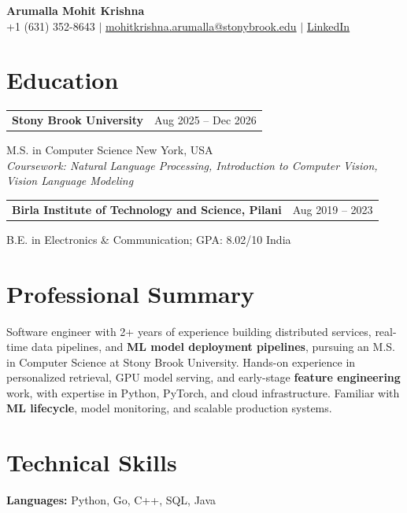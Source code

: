 \documentclass[letterpaper,10pt]{article}
\makeatletter
\newcommand{\entry}[2]{%
  \noindent
  \begin{tabularx}{\linewidth}
    {@{}>{\raggedright\arraybackslash}X@{\hspace{6pt}}r@{}}
    \textbf{#1} & #2
  \end{tabularx}\par
}
\makeatother
\begin{document}
\begin{center}
    {\LARGE\bfseries Arumalla Mohit Krishna}\\[3pt]
    +1 (631) 352-8643 $|$
    \href{mailto:mohitkrishna.arumalla@stonybrook.edu}
    {mohitkrishna.arumalla@stonybrook.edu} $|$
    \href{https://linkedin.com/in/mohit-krishna-arumalla}
    {LinkedIn}
\end{center}
\vspace{-8pt}

\section{Education}

\entry
  {\textbf{Stony Brook University}}
  {Aug 2025 -- Dec 2026}

M.S. in Computer Science \hfill New York, USA\\
\textit{
Coursework: Natural Language Processing,
Introduction to Computer Vision, Vision Language Modeling
}
\vspace{3pt}

\entry
  {\textbf{Birla Institute of Technology and Science, Pilani}}
  {Aug 2019 -- 2023}

B.E. in Electronics \& Communication; GPA: 8.02/10 \hfill India

\section{Professional Summary}

Software engineer with 2+ years of experience building distributed services,
real-time data pipelines, and \textbf{ML model deployment pipelines},
pursuing an M.S. in Computer Science at Stony Brook University. Hands-on experience in personalized
retrieval, GPU model serving, and early-stage \textbf{feature engineering} work,
with expertise in Python, PyTorch, and cloud infrastructure. Familiar with \textbf{ML lifecycle},
model monitoring, and scalable production systems.

\section{Technical Skills}

\textbf{Languages:}
Python, Go, C++, SQL, Java\\
\end{document}
